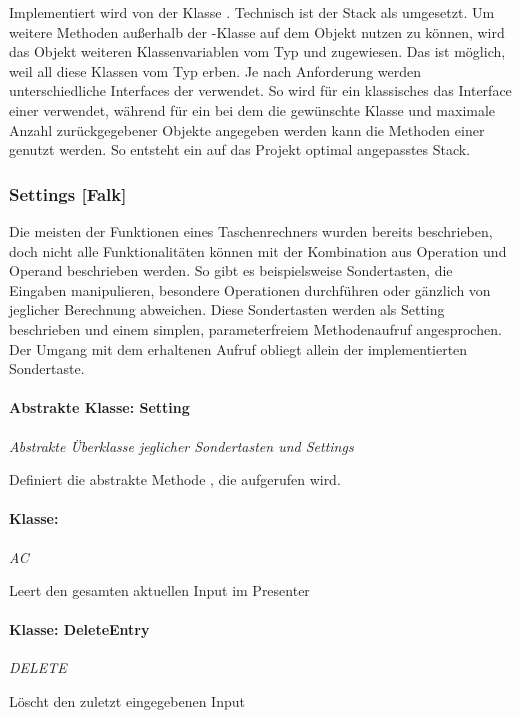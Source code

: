 Implementiert wird  von der Klasse . Technisch ist der Stack als  umgesetzt. Um weitere Methoden außerhalb der -Klasse auf dem Objekt nutzen zu können, wird das Objekt weiteren Klassenvariablen vom Typ  und  zugewiesen. Das ist möglich, weil all diese Klassen vom Typ  erben. Je nach Anforderung werden unterschiedliche Interfaces der  verwendet. So wird für ein klassisches  das Interface einer  verwendet, während für ein  bei dem die gewünschte Klasse und maximale Anzahl zurückgegebener Objekte angegeben werden kann die Methoden einer  genutzt werden. So entsteht ein auf das Projekt optimal angepasstes Stack.

\subsubsection{Settings [Falk]}

Die meisten der Funktionen eines Taschenrechners wurden bereits beschrieben, doch nicht alle Funktionalitäten können mit der Kombination aus Operation und Operand beschrieben werden. So gibt es beispielsweise Sondertasten, die Eingaben manipulieren, besondere Operationen durchführen oder gänzlich von jeglicher Berechnung abweichen. Diese Sondertasten werden als Setting beschrieben und einem simplen, parameterfreiem Methodenaufruf angesprochen. Der Umgang mit dem erhaltenen Aufruf obliegt allein der implementierten Sondertaste.

\paragraph{Abstrakte Klasse: Setting}
\textit{Abstrakte Überklasse jeglicher Sondertasten und Settings}

Definiert die abstrakte Methode , die aufgerufen wird.
\paragraph{Klasse: }
\textit{AC}

Leert den gesamten aktuellen Input im Presenter
\paragraph{Klasse: DeleteEntry}
\textit{DELETE} 

Löscht den zuletzt eingegebenen Input
